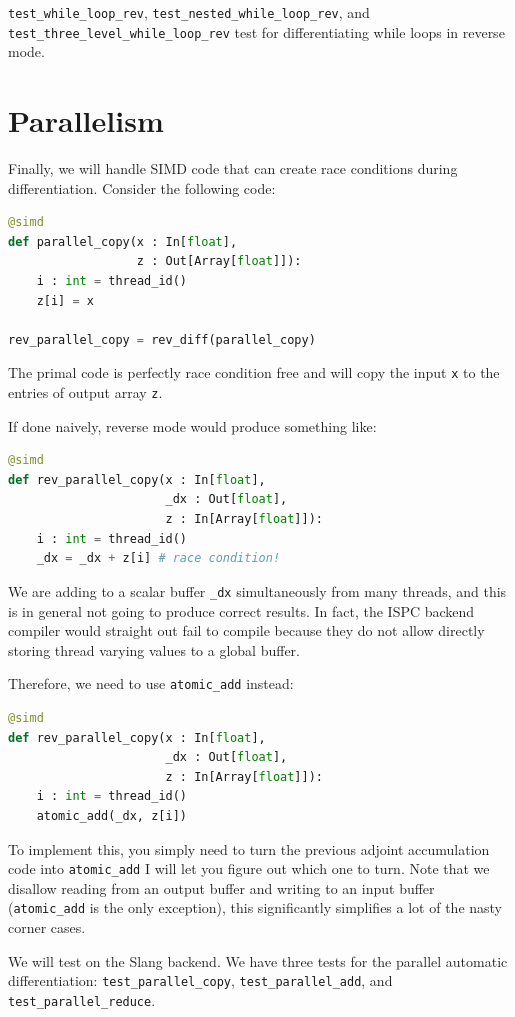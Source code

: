 \lstinline{test_while_loop_rev}, \lstinline{test_nested_while_loop_rev}, and \lstinline{test_three_level_while_loop_rev} test for differentiating while loops in reverse mode.

\section{Parallelism}
Finally, we will handle SIMD code that can create race conditions during differentiation. Consider the following code:
\begin{lstlisting}[language=python]
@simd
def parallel_copy(x : In[float],
                  z : Out[Array[float]]):
    i : int = thread_id()
    z[i] = x

rev_parallel_copy = rev_diff(parallel_copy)
\end{lstlisting}
The primal code is perfectly race condition free and will copy the input \lstinline{x} to the entries of output array \lstinline{z}.

If done naively, reverse mode would produce something like:
\begin{lstlisting}[language=python]
@simd
def rev_parallel_copy(x : In[float],
                      _dx : Out[float],
                      z : In[Array[float]]):
    i : int = thread_id()
    _dx = _dx + z[i] # race condition!
\end{lstlisting}
We are adding to a scalar buffer \lstinline{_dx} simultaneously from many threads, and this is in general not going to produce correct results. In fact, the ISPC backend compiler would straight out fail to compile because they do not allow directly storing thread varying values to a global buffer.

Therefore, we need to use \lstinline{atomic_add} instead:
\begin{lstlisting}[language=python]
@simd
def rev_parallel_copy(x : In[float],
                      _dx : Out[float],
                      z : In[Array[float]]):
    i : int = thread_id()
    atomic_add(_dx, z[i])
\end{lstlisting}

To implement this, you simply need to turn the previous adjoint accumulation code into \lstinline{atomic_add} I will let you figure out which one to turn. Note that we disallow reading from an output buffer and writing to an input buffer (\lstinline{atomic_add} is the only exception), this significantly simplifies a lot of the nasty corner cases.

We will test on the Slang backend. We have three tests for the parallel automatic differentiation: \lstinline{test_parallel_copy}, \lstinline{test_parallel_add}, and \lstinline{test_parallel_reduce}.

